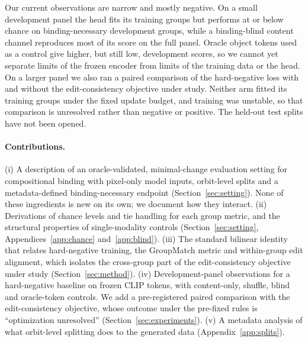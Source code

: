 Our current observations are narrow and mostly negative. On a small development panel the head
fits its training groups but performs at or below chance on binding-necessary development groups,
while a binding-blind content channel reproduces most of its score on the full panel. Oracle
object tokens used as a control give higher, but still low, development scores, so we cannot yet
separate limits of the frozen encoder from limits of the training data or the head. On a larger
panel we also ran a paired comparison of the hard-negative loss with and without the edit-consistency
objective under study. Neither arm fitted its training groups under the fixed update budget, and
training was unstable, so that comparison is unresolved rather than negative or positive. The
held-out test splits have not been opened.

\paragraph{Contributions.} (i) A description of an oracle-validated, minimal-change evaluation
setting for compositional binding with pixel-only model inputs, orbit-level splits and a
metadata-defined binding-necessary endpoint (Section~\ref{sec:setting}). None of these ingredients is new
on its own; we document how they interact. (ii) Derivations of chance levels and tie handling for
each group metric, and the structural properties of single-modality controls (Section~\ref{sec:setting},
Appendices~\ref{app:chance} and~\ref{app:blind}). (iii) The standard bilinear identity that relates hard-negative
training, the GroupMatch metric \citep{zhu2025ttm} and within-group edit alignment, which isolates
the cross-group part of the edit-consistency objective under study (Section~\ref{sec:method}).
(iv) Development-panel observations for a hard-negative baseline on frozen CLIP tokens, with
content-only, shuffle, blind and oracle-token controls. We add a pre-registered paired comparison
with the edit-consistency objective, whose outcome under the pre-fixed rules is ``optimization
unresolved'' (Section~\ref{sec:experiments}). (v) A metadata analysis of what orbit-level
splitting does to the generated data (Appendix~\ref{app:splits}).
